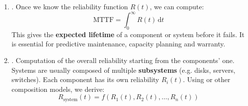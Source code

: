 \begin{enumerate}
    \item {}. Once we know the reliability function $R(t)$, we can compute:
    \begin{equation*}
        \text{MTTF} = \displaystyle\int_{0}^{\infty} R(t) \, \mathrm{d}t
    \end{equation*}
    This gives the \textbf{expected lifetime} of a component or system before it fails. It is essential for predictive maintenance, capacity planning and warranty.

    \item {}. Computation of the overall reliability starting from the components' one. Systems are usually composed of multiple \textbf{subsystems} (e.g. disks, servers, switches). Each component has its own reliability $R_{i}(t)$. Using  or other composition models, we derive:
    \begin{equation*}
        R_{\text{system}}(t) = f\left(R_{1}(t), R_{2}(t), \dots, R_{n}(t)\right)
    \end{equation*}


\end{enumerate}
